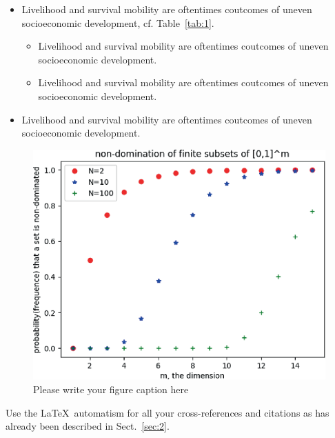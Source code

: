 \begin{itemize}
    \item{Livelihood and survival mobility are oftentimes coutcomes of uneven socioeconomic development, cf. Table~\ref{tab:1}.}
          \begin{itemize}
              \item{Livelihood and survival mobility are oftentimes coutcomes of uneven socioeconomic development.}
              \item{Livelihood and survival mobility are oftentimes coutcomes of uneven socioeconomic development.}
          \end{itemize}
    \item{Livelihood and survival mobility are oftentimes coutcomes of uneven socioeconomic development.}
\end{itemize}

\begin{figure}[t]
    \sidecaption[t]
    \includegraphics{figure}
    \caption{Please write your figure caption here}
    \label{fig:2}       %
\end{figure}

 Use the \LaTeX\ automatism for all your cross-references and citations as has already been described in Sect.~\ref{sec:2}.

